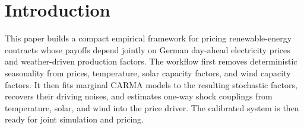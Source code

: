 \section{Introduction}\label{sec:introduction}

This paper builds a compact empirical framework for pricing renewable-energy
contracts whose payoffs depend jointly on German day-ahead electricity prices
and weather-driven production factors. The workflow first removes deterministic
seasonality from prices, temperature, solar capacity factors, and wind capacity
factors. It then fits marginal CARMA models to the resulting stochastic factors,
recovers their driving noises, and estimates one-way shock couplings from
temperature, solar, and wind into the price driver. The calibrated system is
then ready for joint simulation and pricing.

